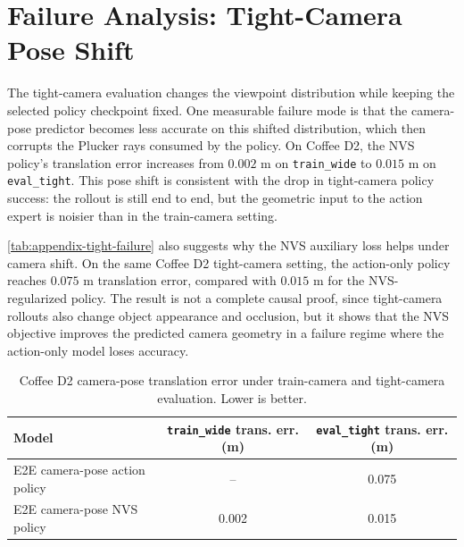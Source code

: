 \begin{table}[ht]
  \centering
  \caption{Camera-pose prediction losses and errors for the MimicGen NVS policy.}
  \label{tab:appendix-cam-pose-loss}
\end{table}

\section{Failure Analysis: Tight-Camera Pose Shift}
\label{sec:appendix-tight-failure}

The tight-camera evaluation changes the viewpoint distribution while keeping the
selected policy checkpoint fixed.  One measurable failure mode is that the
camera-pose predictor becomes less accurate on this shifted distribution, which
then corrupts the Plucker rays consumed by the policy.  On Coffee D2, the NVS
policy's translation error increases from \(0.002\) m on \texttt{train\_wide} to
\(0.015\) m on \texttt{eval\_tight}.  This pose shift is consistent with the
drop in tight-camera policy success: the rollout is still end to end, but the
geometric input to the action expert is noisier than in the train-camera
setting.

\autoref{tab:appendix-tight-failure} also suggests why the NVS auxiliary loss
helps under camera shift.  On the same Coffee D2 tight-camera setting, the
action-only policy reaches \(0.075\) m translation error, compared with
\(0.015\) m for the NVS-regularized policy.  The result is not a complete causal
proof, since tight-camera rollouts also change object appearance and occlusion,
but it shows that the NVS objective improves the predicted camera geometry in a
failure regime where the action-only model loses accuracy.

\begin{table}[ht]
  \centering
  \caption{Coffee D2 camera-pose translation error under train-camera and
  tight-camera evaluation.  Lower is better.}
  \label{tab:appendix-tight-failure}
  \begin{tabular}{lcc}
    \toprule
    Model & \texttt{train\_wide} trans. err. (m) & \texttt{eval\_tight} trans. err. (m) \\
    \midrule
    E2E camera-pose action policy & -- & 0.075 \\
    E2E camera-pose NVS policy & 0.002 & 0.015 \\
    \bottomrule
  \end{tabular}
\end{table}

